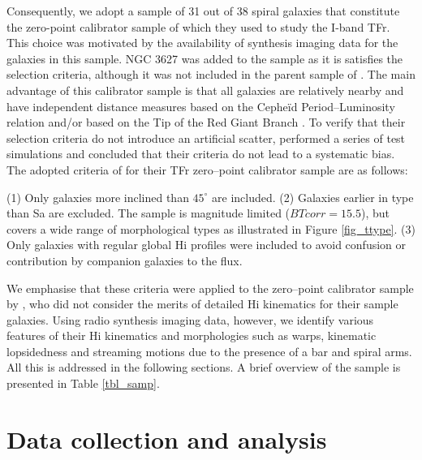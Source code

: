 \documentclass[usenatbib,useAMS]{mnras}
\begin{document}
Consequently, we adopt a sample of 31 out of 38 spiral galaxies that
constitute the zero-point calibrator sample of  which
they used to study the I-band TFr.  This choice was motivated by the
availability of synthesis imaging data for the galaxies in this sample. 
NGC 3627 was added to the sample as it is satisfies the selection
criteria, although it was not included in the parent sample of
.  The main advantage of this calibrator sample is that
all galaxies are relatively nearby and have independent distance
measures based on the Cephe\"id Period--Luminosity relation
\citep{freedman01} and/or based on the Tip of the Red Giant Branch
\citep{rizzi07}.  To verify that their selection criteria do not
introduce an artificial scatter,  performed a series of
test simulations and concluded that their criteria do not lead to a
systematic bias.  The adopted criteria of  for their
TFr zero--point calibrator sample are as follows:

(1) Only galaxies more inclined than $45^{\circ}$ are included.  (2)
Galaxies earlier in type than Sa are excluded.  The sample is magnitude
limited ($BTcorr = 15.5$), but covers a wide range of morphological
types as illustrated in Figure \ref{fig_ttype}.  (3) Only galaxies with
regular global H{\sc i} profiles were included to avoid confusion or
contribution by companion galaxies to the flux. 

We emphasise that these criteria were applied to the zero--point
calibrator sample by , who did not consider the merits
of detailed H{\sc i} kinematics for their sample galaxies.  Using radio
synthesis imaging data, however, we identify various features of their
H{\sc i} kinematics and morphologies such as warps, kinematic
lopsidedness and streaming motions due to the presence of a bar and
spiral arms.  All this is addressed in the following sections.  A brief
overview of the sample is presented in Table \ref{tbl_samp}. 


\section{Data collection and analysis}
\end{document}
